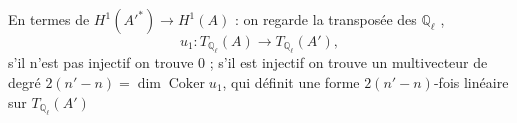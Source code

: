 \documentclass[11pt,a4paper]{article}
\begin{document}
En termes de $H^{1}(A'^{*}) \to H^{1}(A)$ : on regarde la transposée \ill{} des
$\mathbb{Q}_{\ell}$ \struck{\ill{}},
\[
  u_{1} : T_{\mathbb{Q}_{\ell}}(A) \longrightarrow T_{\mathbb{Q}_{\ell}}(A'),
\]
 s'il n'est pas injectif on trouve $0$ ; s'il est injectif on trouve un
multivecteur  de degré $2(n'-n) = \dim \operatorname{Coker} u_{1}$, qui définit
une forme $2(n'-n)$-fois linéaire  sur $T_{\mathbb{Q}_{\ell}}(A')$
\end{document}
